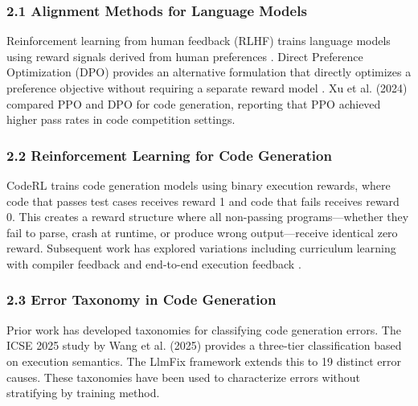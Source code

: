 
\subsubsection{2.1 Alignment Methods for Language Models}

Reinforcement learning from human feedback (RLHF) trains language models using reward signals derived from human preferences \citep{ouyang2022training}. Direct Preference Optimization (DPO) provides an alternative formulation that directly optimizes a preference objective without requiring a separate reward model \citep{rafailov2023direct}. Xu et al. (2024) compared PPO and DPO for code generation, reporting that PPO achieved higher pass rates in code competition settings.

\subsubsection{2.2 Reinforcement Learning for Code Generation}

CodeRL \citep{le2022coderl} trains code generation models using binary execution rewards, where code that passes test cases receives reward 1 and code that fails receives reward 0. This creates a reward structure where all non-passing programs---whether they fail to parse, crash at runtime, or produce wrong output---receive identical zero reward. Subsequent work has explored variations including curriculum learning with compiler feedback \citep{dou2024stepcoder} and end-to-end execution feedback \citep{liu2024rlef}.

\subsubsection{2.3 Error Taxonomy in Code Generation}

Prior work has developed taxonomies for classifying code generation errors. The ICSE 2025 study by Wang et al. (2025) provides a three-tier classification based on execution semantics. The LlmFix framework \citep{zhang2024llmfix} extends this to 19 distinct error causes. These taxonomies have been used to characterize errors without stratifying by training method.
